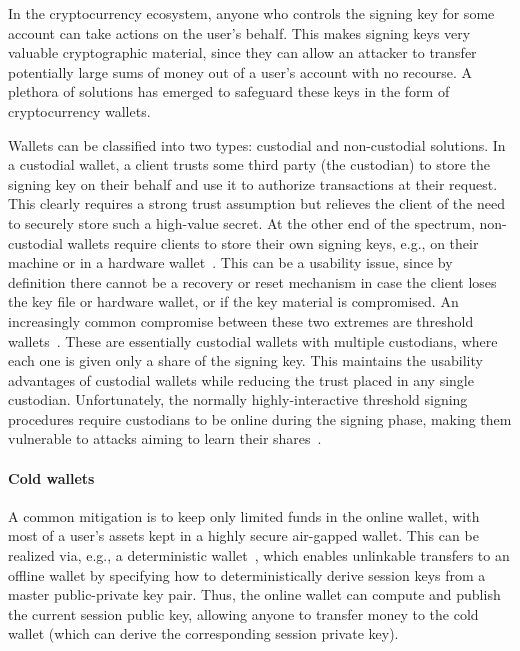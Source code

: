 In the cryptocurrency ecosystem, anyone who controls the signing key for some account can take actions on the user's behalf. This makes signing keys very valuable cryptographic material, since they can allow an attacker to transfer potentially large sums of money out of a user's account with no recourse. A plethora of solutions has emerged to safeguard these keys in the form of cryptocurrency wallets.

Wallets can be classified into two types: custodial and non-custodial solutions. In a custodial wallet, a client trusts some third party (the custodian) to store the signing key on their behalf and use it to authorize transactions at their request. This clearly requires a strong trust assumption but relieves the client of the need to securely store such a high-value secret. At the other end of the spectrum, non-custodial wallets require clients to store their own signing keys, e.g., on their machine or in a hardware wallet~\cite{FC:AGKK19}. This can be a usability issue, since by definition there cannot be a recovery or reset mechanism in case the client loses the key file or hardware wallet, or if the key material is compromised. An increasingly common compromise between these two extremes are threshold wallets~\cite{SP:KMOS21,EPRINT:DEFLR23,EPRINT:BloMakPel22,EPRINT:Eyal21}. These are essentially custodial wallets with multiple custodians, where each one is given only a share of the signing key. This maintains the usability advantages of custodial wallets while reducing the trust placed in any single custodian.
Unfortunately, the normally highly-interactive threshold signing procedures require custodians to be online during the signing phase, making them vulnerable to attacks aiming to learn their shares~\cite{ecdsa_threshold_attack,NIST_MPC_Attack}.

\paragraph{Cold wallets}
A common mitigation is to keep only limited funds in the online wallet, with most of a user's assets kept in a highly secure air-gapped wallet. This can be realized via, e.g., a deterministic wallet~\cite{deterministic_wallets,CCS:DasFauLos19,CCS:ADEFKRS20,EPRINT:Hu23,ESORICS:ErwRia22}, which enables unlinkable transfers to an offline wallet by specifying how to deterministically derive session keys from a master public-private key pair. Thus, the online wallet can compute and publish the current session public key, allowing anyone to transfer money to the cold wallet (which can derive the corresponding session private key). 

